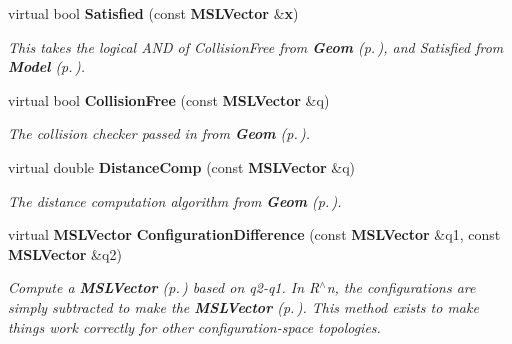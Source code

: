 \begin{CompactItemize}
virtual bool {\bf Satisfied} (const {\bf MSLVector} \&{\bf x})
\begin{CompactList}\small\item\em This takes the logical AND of Collision\-Free from {\bf Geom} {\rm (p.\,\pageref{classGeom})}, and Satisfied from {\bf Model} {\rm (p.\,\pageref{classModel})}.\item\end{CompactList}\item 
virtual bool {\bf Collision\-Free} (const {\bf MSLVector} \&q)
\begin{CompactList}\small\item\em The collision checker passed in from {\bf Geom} {\rm (p.\,\pageref{classGeom})}.\item\end{CompactList}\item 
virtual double {\bf Distance\-Comp} (const {\bf MSLVector} \&q)
\begin{CompactList}\small\item\em The distance computation algorithm from {\bf Geom} {\rm (p.\,\pageref{classGeom})}.\item\end{CompactList}\item 
virtual {\bf MSLVector} {\bf Configuration\-Difference} (const {\bf MSLVector} \&q1, const {\bf MSLVector} \&q2)
\begin{CompactList}\small\item\em Compute a {\bf MSLVector} {\rm (p.\,\pageref{classMSLVector})} based on q2-q1. In R$^\wedge$n, the configurations are simply subtracted to make the {\bf MSLVector} {\rm (p.\,\pageref{classMSLVector})}. This method exists to make things work correctly for other configuration-space topologies.\item\end{CompactList}\end{CompactItemize}
